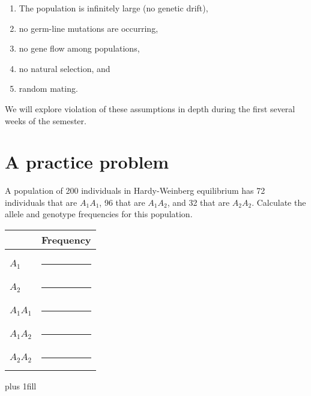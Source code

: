 \documentclass[letterpaper]{tufte-handout}
\begin{document}
\begin{enumerate}

	\item The population is infinitely large (no genetic drift),

	\item no germ-line mutations are occurring,

	\item no gene flow among populations,

	\item no natural selection, and

	\item random mating.

	
\end{enumerate}

We will explore violation of these assumptions in depth during the first several weeks of the semester.

\section*{A practice problem}

\noindent A population of 200 individuals in Hardy-Weinberg equilibrium
has 72 individuals that are $A_1A_1$, 96 that are $A_1A_2$, and 32 
that are $A_2A_2$. Calculate the allele and genotype frequencies 
for this population.

\bigskip

\begin{tabular}{@{}ll@{}}
	\toprule
	& Frequency\tabularnewline
	\midrule
	& \tabularnewline
	$A_1$		&	\rule{0.6in}{0.4pt}\tabularnewline[2em]
	$A_2$		&	\rule{0.6in}{0.4pt}\tabularnewline[2em]
	$A_1A_1$	&	\rule{0.6in}{0.4pt}\tabularnewline[2em]
	$A_1A_2$	&	\rule{0.6in}{0.4pt}\tabularnewline[2em]
	$A_2A_2$	&	\rule{0.6in}{0.4pt}\tabularnewline
	\bottomrule
\end{tabular}


\vskip0pt plus 1fill


\begin{margintable}
\hfill {}
\end{margintable}
\end{document}
